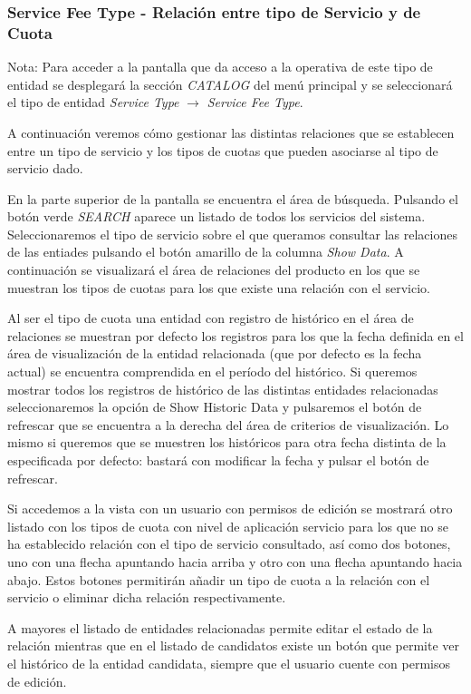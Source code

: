 \subsubsection{Service Fee Type - Relación entre tipo de Servicio y de Cuota}
\label{sub:product-fee-type-relation}

Nota: Para acceder a la pantalla que da acceso a la operativa de este tipo de entidad se desplegará la sección \emph{CATALOG} del menú principal y se seleccionará el tipo de entidad \emph{Service Type} $\rightarrow$  \emph{Service Fee Type}.


A continuación veremos cómo gestionar las distintas relaciones que se establecen entre un tipo de servicio y los tipos de cuotas que pueden asociarse al tipo de servicio dado.


En la parte superior de la pantalla se encuentra el área de búsqueda. Pulsando el botón verde \emph{SEARCH} aparece un listado de todos los servicios del sistema. Seleccionaremos el tipo de servicio sobre el que queramos consultar las relaciones de las entiades pulsando el botón amarillo de la columna \emph{Show Data}. A continuación se visualizará el área de relaciones del producto en los que se muestran los tipos de cuotas para los que existe una relación con el servicio.

Al ser el tipo de cuota una entidad con registro de histórico en el área de relaciones se muestran por defecto los registros para los que la fecha definida en el área de visualización de la entidad relacionada (que por defecto es la fecha actual) se encuentra comprendida en el período del histórico. Si queremos mostrar todos los registros de histórico de las distintas entidades relacionadas seleccionaremos la opción de Show Historic Data y pulsaremos el botón de refrescar que se encuentra a la derecha del área de criterios de visualización. Lo mismo si queremos que se muestren los históricos para otra fecha distinta de la especificada por defecto: bastará con modificar la fecha y pulsar el botón de refrescar.

Si accedemos a la vista con un usuario con permisos de edición se mostrará otro listado con los tipos de cuota con nivel de aplicación servicio para los que no se ha establecido relación con el tipo de servicio consultado, así como dos botones, uno con una flecha apuntando hacia arriba y otro con una flecha apuntando hacia abajo. Estos botones permitirán añadir un tipo de cuota a la relación con el servicio o eliminar dicha relación respectivamente. 

A mayores el listado de entidades relacionadas permite editar el estado de la relación mientras que en el listado de candidatos existe un botón que permite ver el histórico de la entidad candidata, siempre que el usuario cuente con permisos de edición.



